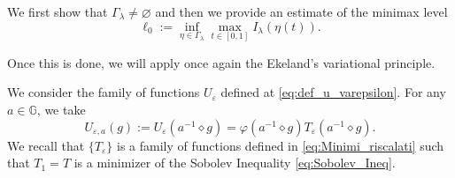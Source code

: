 \documentclass[11pt]{amsart}
\numberwithin{equation}{section} %
\theoremstyle{definition}
\def\G{\mathbb{G}}
\begin{document}
\noindent We first show that $\Gamma_\lambda\neq \varnothing$
and then we provide an estimate of the minimax level
\[
\ell_0:=\inf_{\eta\in\Gamma_\lambda}\max_{t\in[0,1]}I_\lambda(\eta(t)).
\]

\noindent Once this is done, we will apply once again the Ekeland's variational principle.

\noindent We consider the family of functions $U_\varepsilon$ defined
at \eqref{eq:def_u_varepsilon}.
For any $a\in \G$, we take
\[
U_{\varepsilon,a}(g):=U_\varepsilon(a^{-1}\diamond g)
= {\varphi(a^{-1}\diamond g) T_{\varepsilon}(a^{-1}\diamond g)}.
\]
We recall that $\{T_\varepsilon\}$ is a family
of functions defined in \eqref{eq:Minimi_riscalati} such that  $T_1=T$
is a minimizer of the Sobolev Inequality \eqref{eq:Sobolev_Ineq}.
\end{document}
